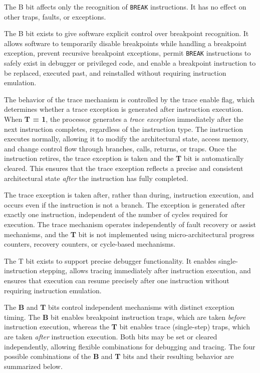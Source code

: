 The B bit affects only the recognition of \texttt{BREAK} instructions. It has no effect on other traps, faults, or exceptions.

The B bit exists to give software explicit control over breakpoint recognition. It allows software to temporarily disable breakpoints while handling a breakpoint exception, prevent recursive breakpoint exceptions, permit \texttt{BREAK} instructions to safely exist in debugger or privileged code, and enable a breakpoint instruction to be replaced, executed past, and reinstalled without requiring instruction emulation.



The behavior of the trace mechanism is controlled by the trace enable flag, which determines whether a trace exception is generated after instruction execution. When \textbf{T = 1}, the processor generates a \emph{trace exception} immediately after the next instruction completes, regardless of the instruction type. The instruction executes normally, allowing it to modify the architectural state, access memory, and change control flow through branches, calls, returns, or traps. Once the instruction retires, the trace exception is taken and the \textbf{T} bit is automatically cleared. This ensures that the trace exception reflects a precise and consistent architectural state \emph{after} the instruction has fully completed.

The trace exception is taken after, rather than during, instruction execution, and occurs even if the instruction is not a branch. The exception is generated after exactly one instruction, independent of the number of cycles required for execution. The trace mechanism operates independently of fault recovery or assist mechanisms, and the \textbf{T} bit is not implemented using micro-architectural progress counters, recovery counters, or cycle-based mechanisms.

The T bit exists to support precise debugger functionality. It enables single-instruction stepping, allows tracing immediately after instruction execution, and ensures that execution can resume precisely after one instruction without requiring instruction emulation.


The \textbf{B} and \textbf{T} bits control independent mechanisms with distinct exception timing. The \textbf{B} bit enables breakpoint instruction traps, which are taken \emph{before} instruction execution, whereas the \textbf{T} bit enables trace (single-step) traps, which are taken \emph{after} instruction execution.
Both bits may be set or cleared independently, allowing flexible combinations for debugging and tracing. The four possible combinations of the \textbf{B} and \textbf{T} bits and their resulting behavior are summarized below.

